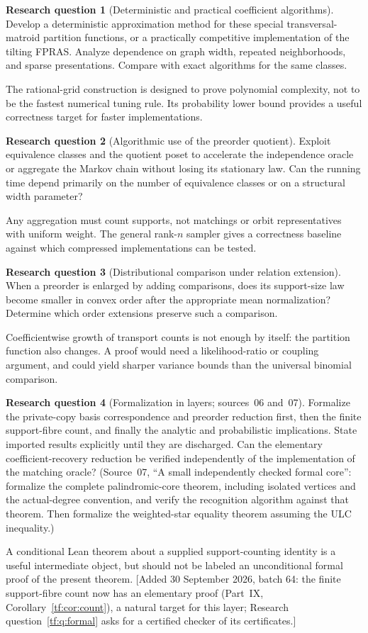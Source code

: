 \documentclass[11pt]{article}
\numberwithin{equation}{section}
\theoremstyle{definition}
\newtheorem{question}{Research question}%
\begin{document}
\begin{question}[Deterministic and practical coefficient algorithms]
Develop a deterministic approximation method for these special
transversal-matroid partition functions, or a practically competitive
implementation of the tilting FPRAS. Analyze dependence on graph width,
repeated neighborhoods, and sparse presentations. Compare with exact
algorithms for the same classes.
\end{question}
The rational-grid construction is designed to prove polynomial complexity,
not to be the fastest numerical tuning rule. Its probability lower bound
provides a useful correctness target for faster implementations.

\begin{question}[Algorithmic use of the preorder quotient]
Exploit equivalence classes and the quotient poset to accelerate the independence
oracle or aggregate the Markov chain without losing its stationary law.
Can the running time depend primarily on the number of equivalence classes or
on a structural width parameter?
\end{question}
Any aggregation must count supports, not matchings or orbit representatives
with uniform weight. The general rank-$n$ sampler gives a correctness baseline
against which compressed implementations can be tested.

\begin{question}[Distributional comparison under relation extension]
When a preorder is enlarged by adding comparisons, does its support-size law
become smaller in convex order after the appropriate mean normalization?
Determine which order extensions preserve such a comparison.
\end{question}
Coefficientwise growth of transport counts is not enough by itself: the
partition function also changes. A proof would need a likelihood-ratio or
coupling argument, and could yield sharper variance bounds than the universal
binomial comparison.

\begin{question}[Formalization in layers; sources~06 and~07]\label{lor:q:last}
Formalize the private-copy basis correspondence and preorder reduction
first, then the finite support-fibre count, and finally the analytic and
probabilistic implications. State imported results explicitly until they
are discharged. Can the elementary coefficient-recovery reduction be
verified independently of the implementation of the matching oracle?
(Source~07, ``A small independently checked formal core'': formalize the complete palindromic-core theorem, including isolated vertices
and the actual-degree convention, and verify the recognition algorithm against
that theorem. Then formalize the weighted-star equality theorem assuming the
ULC inequality.)
\end{question}
A conditional Lean theorem about a supplied support-counting identity is a
useful intermediate object, but should not be labeled an unconditional
formal proof of the present theorem.
[Added 30 September 2026, batch 64: the finite support-fibre count now
has an elementary proof (Part~IX, Corollary~\ref{tf:cor:count}), a
natural target for this layer; Research question~\ref{tf:q:formal} asks
for a certified checker of its certificates.]
\end{document}
